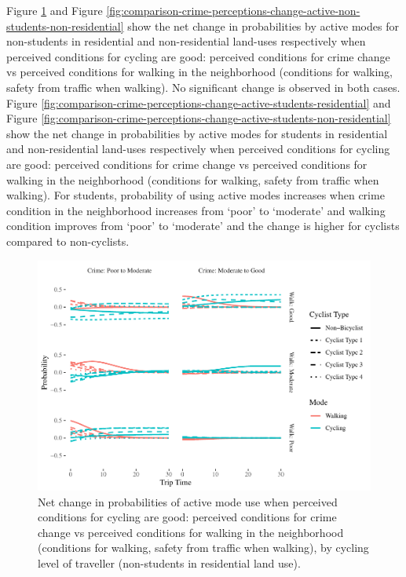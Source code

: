\documentclass[]{elsarticle} %
\makeatletter
\def\maxwidth{\ifdim\Gin@nat@width>\linewidth\linewidth
\else\Gin@nat@width\fi}
\let\Oldincludegraphics\includegraphics
\renewcommand{\includegraphics}[1]{\Oldincludegraphics[width=\maxwidth]{#1}}
\makeatother
\begin{document}
Figure
\ref{fig:comparison-crime-perceptions-change-active-non-students-residential}
and Figure
\ref{fig:comparison-crime-perceptions-change-active-non-students-non-residential}
show the net change in probabilities by active modes for non-students in
residential and non-residential land-uses respectively when perceived
conditions for cycling are good: perceived conditions for crime change
vs perceived conditions for walking in the neighborhood (conditions for
walking, safety from traffic when walking). No significant change is
observed in both cases. Figure
\ref{fig:comparison-crime-perceptions-change-active-students-residential}
and Figure
\ref{fig:comparison-crime-perceptions-change-active-students-non-residential}
show the net change in probabilities by active modes for students in
residential and non-residential land-uses respectively when perceived
conditions for cycling are good: perceived conditions for crime change
vs perceived conditions for walking in the neighborhood (conditions for
walking, safety from traffic when walking). For students, probability of
using active modes increases when crime condition in the neighborhood
increases from `poor' to `moderate' and walking condition improves from
`poor' to `moderate' and the change is higher for cyclists compared to
non-cyclists.

\begin{figure}
\centering
\includegraphics{Active-Travel-in-Bangladesh_files/figure-latex/figure-comparison-crime-perceptions-change-active-non-students-residential-1.pdf}
\caption{\label{fig:comparison-crime-perceptions-change-active-non-students-residential}Net
change in probabilities of active mode use when perceived conditions for
cycling are good: perceived conditions for crime change vs perceived
conditions for walking in the neighborhood (conditions for walking,
safety from traffic when walking), by cycling level of traveller
(non-students in residential land use).}
\end{figure}
\end{document}
